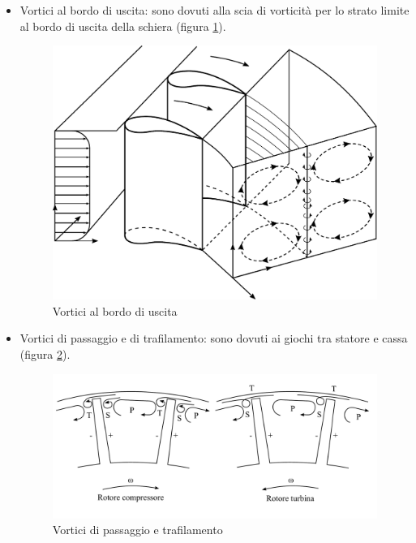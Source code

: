 \begin{itemize}
\begin{figure}[h!]
\end{figure}
\item Vortici al bordo di uscita: sono dovuti alla scia di vorticità per lo strato limite al bordo di uscita della schiera (figura \ref{fd:VortVall}).
\begin{figure}[h!]
	\centering
	\includegraphics[width=.6\textwidth]{fig/VortVall.pdf}
	\caption{Vortici al bordo di uscita}
	\label{fd:VortVall}
\end{figure}
\item Vortici di passaggio e di trafilamento: sono dovuti ai giochi tra statore e cassa (figura \ref{fd:VortTraf}).
\begin{figure}[h!]
	\centering
	\includegraphics[width=.8\textwidth]{fig/VortTraf.pdf}
	\caption{Vortici di passaggio e trafilamento}
	\label{fd:VortTraf}
\end{figure}
\end{itemize}


